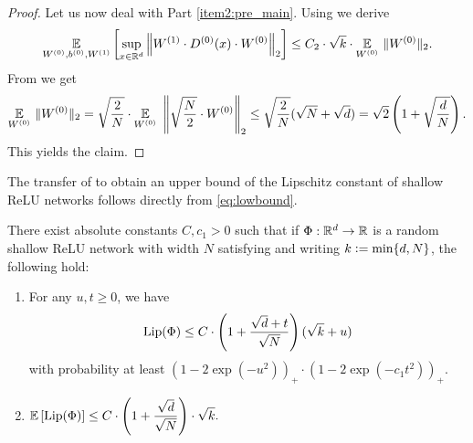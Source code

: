 \begin{proof}
Let us now deal with Part \eqref{item2:pre_main}. Using  we derive
\begin{equation*}
\underset{W^{(0)},b^{(0)},W^{(1)}}{\mathbb{E}} \left[ \underset{x \in \mathbb{R}^d}{\sup} \left\Vert W^{(1)} \cdot D^{(0)}(x) \cdot W^{(0)}\right\Vert_2 \right]\leq C_2 \cdot \sqrt{k} \cdot \underset{W^{(0)}}{\mathbb{E}} \ \Vert W^{(0)} \Vert_2.
\end{equation*}
From \cite[Theorem 7.3.1]{vershynin_high-dimensional_2018} we get
\begin{equation*}
\underset{W^{(0)}}{\mathbb{E}} \ \Vert W^{(0)} \Vert_2 = \sqrt{\frac{2}{N}} \cdot \underset{W^{(0)}}{\mathbb{E}} \   \left\Vert \sqrt{\frac{N}{2}} \cdot W^{(0)} \right\Vert_2 \leq\sqrt{\frac{2}{N}}(\sqrt{N} + \sqrt{d}) =\sqrt{2} \left(1 + \sqrt{\frac{d}{N}}\right).
\end{equation*}
This yields the claim.
\end{proof}

The transfer of  to obtain an upper bound of the Lipschitz constant of shallow ReLU networks follows directly from \eqref{eq:lowbound}.
\begin{theorem} \label{thm:1_main}
There exist absolute constants $C, c_1 > 0$ such that if $\Phi: \mathbb{R}^d \to \mathbb{R}$ is a random shallow ReLU network with width $N$ satisfying  and writing $k \mathrel{\mathop:}= \min\{d,N\}$, the following hold:
\begin{enumerate}
\item{For any $u,t \geq 0$, we have
\begin{equation*}
\operatorname{Lip}(\Phi) \leq C \cdot \left(1 + \frac{\sqrt{d} + t}{\sqrt{N}}\right)(\sqrt{k} + u)
\end{equation*}
with probability at least $(1-2\exp(-u^2))_+ \cdot (1-2\exp(-c_1t^2))_+$.}
\item{$ \displaystyle
\mathbb{E} \left[\operatorname{Lip}(\Phi) \right]  \leq C \cdot \left(1+ \frac{\sqrt{d} }{\sqrt{N}} \right) \cdot \sqrt{k}.
$}
\end{enumerate}
\end{theorem}


